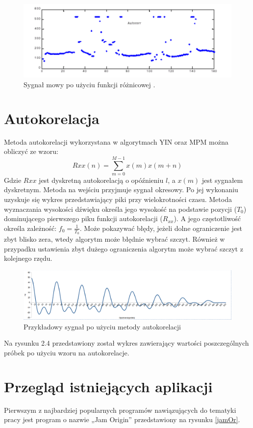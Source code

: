    \begin{figure}[h!]
  \centering
  \includegraphics[width=0.7\linewidth]{rys/amdf2}
  \caption{Sygnał mowy po użyciu funkcji różnicowej \cite{AMDF}.}
  \label{amdf2}
\end{figure}

 \section{{Autokorelacja}}
Metoda autokorelacji wykorzystana w algorytmach YIN oraz MPM można obliczyć ze wzoru:
\begin{equation}
\label{equation:2}
   Rxx(n) = \sum_{m=0}^{M-1}{x(m)x(m+n)}
\end{equation}
Gdzie $Rxx$ jest dyskretną autokorelacją o opóźnieniu $l$, a $x(m)$ jest sygnałem dyskretnym. Metoda na wejściu przyjmuje sygnał okresowy. Po jej wykonaniu uzyskuje się wykres przedstawiający piki przy wielokrotności czasu. Metoda
  wyznaczania wysokości dźwięku określa jego wysokość na podstawie pozycji
  ($T_0$) dominującego pierwszego piku funkcji autokorelacji ($R_{xx}$).
  A jego częstotliwość określa zależność: $f_0=\frac{1}{T_0}$. Może pokazywać błędy, jeżeli dolne ograniczenie jest zbyt blisko zera, wtedy algorytm może błędnie wybrać szczyt. Również w przypadku ustawienia zbyt dużego ograniczenia algorytm może wybrać szczyt z kolejnego rzędu.

 \begin{figure}[h!]
  \centering
  \includegraphics[width=0.7\linewidth]{rys/autocorelation}
  \caption{Przykładowy sygnał po użyciu metody autokorelacji}
  \label{autocorelation}
\end{figure}
Na rysunku 2.4 przedstawiony został wykres zawierający wartości poszczególnych próbek po użyciu wzoru na autokorelacje.


\section{{Przegląd istniejących aplikacji}}
Pierwszym z najbardziej popularnych programów nawiązujących do tematyki pracy jest program o nazwie „Jam Origin” przedstawiony na rysunku \ref{jamOr}. 


